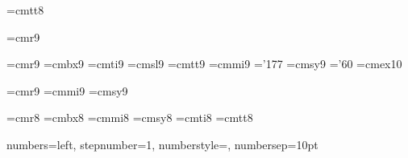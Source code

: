 \font\ninett=cmtt8

\font\nine=cmr9

\font\ninerm=cmr9
\font\ninebf=cmbx9
\font\nineit=cmti9
\font\ninesl=cmsl9
\font\ninett=cmtt9
\font\ninemi=cmmi9  \skewchar\ninemi='177
\font\ninesy=cmsy9  \skewchar\ninesy='60
\font\nineex=cmex10


\font\mathninerm=cmr9
\font\mathninei=cmmi9
\font\mathninesy=cmsy9


\def\ninepoint{\def\rm{\fam0\ninerm}%
\textfont0=\mathninerm\scriptfont0=\mathsevenrm\scriptscriptfont0=\mathfiverm%
\textfont1=\mathninei\scriptfont1=\mathseveni\scriptscriptfont1=\mathfivei%
\textfont2=\mathninesy\scriptfont2=\mathsevensy\scriptscriptfont2=\mathfivesy%
\textfont3=\tenex
\let\sc=\sevenrm
 \def\it{\fam\itfam\nineit}%
  \textfont\itfam=\nineit
  \def\bf{\fam\bffam\ninebf}%
  \textfont\bffam=\ninebf
  \def\tt{\fam\ttfam\ninett}%
  \textfont\ttfam=\ninett
  \setbox\strutbox=\hbox{\vrule height9pt depth4pt width0pt}%
  \baselineskip=11pt\rm}


\newenvironment{boxit}{\vbox\bgroup\hrule\hbox\bgroup\vrule\kern3pt
    \vbox\bgroup\kern3pt\advance\hsize by -6.8pt\relax}{\par\kern3pt\egroup\kern3pt\vrule\egroup\hrule\egroup}

\font\matheightrm=cmr8
\font\matheightbf=cmbx8
\font\matheighti=cmmi8
\font\matheightsy=cmsy8
\font\eightit=cmti8
\font\eighttt=cmtt8



\def\eightpoint{%
\textfont0=\matheightrm%
\scriptfont0=\mathsixrm\scriptscriptfont0=\mathfiverm
\textfont1=\matheighti\scriptfont1=\mathsixi\scriptscriptfont1=\mathfivei%
\textfont2=\matheightsy\scriptfont2=\mathsixsy\scriptscriptfont2=\mathfivesy%
\def\rm{\fam0\matheightrm}%
\def\it{\fam\itfam\eightit}%
\textfont\itfam=\eightit%
  \def\bf{\fam\bffam\matheightbf}%
  \textfont\bffam=\matheightbf%
  \def\tt{\fam\ttfam\eighttt}%
  \textfont\ttfam=\eighttt%
  \setbox\strutbox=\hbox{\vrule height7pt depth2pt width0pt}%
 \baselineskip=9pt\rm}


{numbers=left, stepnumber=1, numberstyle=\tiny, numbersep=10pt}

\lstset{
   basicstyle=\small\tt, %
   language = ML,
   numberstyle=\small,
   style = numbers,
   keywordstyle=\bf,
   showstringspaces=false} %

